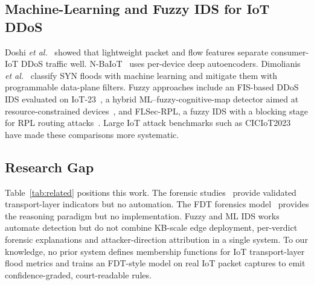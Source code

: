 \documentclass[conference]{IEEEtran}
\begin{document}
\subsection{Machine-Learning and Fuzzy IDS for IoT DDoS}
Doshi \emph{et al.}~\cite{doshi2018} showed that lightweight packet and flow features separate consumer-IoT DDoS traffic well. N-BaIoT~\cite{meidan2018} uses per-device deep autoencoders. Dimolianis \emph{et al.}~\cite{dimolianis2021} classify SYN floods with machine learning and mitigate them with programmable data-plane filters. Fuzzy approaches include an FIS-based DDoS IDS evaluated on IoT-23~\cite{hoang2022}, a hybrid ML--fuzzy-cognitive-map detector aimed at resource-constrained devices~\cite{keshavamurthy2024}, and FLSec-RPL, a fuzzy IDS with a blocking stage for RPL routing attacks~\cite{kim2024}. Large IoT attack benchmarks such as CICIoT2023~\cite{neto2023} have made these comparisons more systematic.

\subsection{Research Gap}
Table~\ref{tab:related} positions this work. The forensic studies~\cite{naing2023,khaing2020} provide validated transport-layer indicators but no automation. The FDT forensics model~\cite{ye2022} provides the reasoning paradigm but no implementation. Fuzzy and ML IDS works automate detection but do not combine KB-scale edge deployment, per-verdict forensic explanations and attacker-direction attribution in a single system. To our knowledge, no prior system defines membership functions for IoT transport-layer flood metrics and trains an FDT-style model on real IoT packet captures to emit confidence-graded, court-readable rules.
\end{document}
